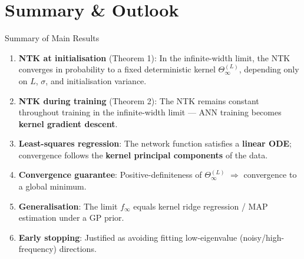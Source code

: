 \documentclass[aspectratio=169, 10pt]{beamer}
\newcommand{\NTK}{\Theta^{(L)}_\infty}
\newcommand{\highlight}[1]{\textcolor{blue!70!black}{\textbf{#1}}}
\begin{document}
\section{Summary \& Outlook}

\begin{frame}{Summary of Main Results}
  \begin{enumerate}
    \setlength\itemsep{0.5em}
    \item \textbf{NTK at initialisation} (Theorem 1): In the infinite-width limit, the NTK converges in probability to a fixed deterministic kernel $\NTK$, depending only on $L$, $\sigma$, and initialisation variance.
    \item \textbf{NTK during training} (Theorem 2): The NTK remains constant throughout training in the infinite-width limit — ANN training becomes \highlight{kernel gradient descent}.
    \item \textbf{Least-squares regression}: The network function satisfies a \textbf{linear ODE}; convergence follows the \highlight{kernel principal components} of the data.
    \item \textbf{Convergence guarantee}: Positive-definiteness of $\NTK$ $\Rightarrow$ convergence to a global minimum.
    \item \textbf{Generalisation}: The limit $f_\infty$ equals kernel ridge regression / MAP estimation under a GP prior.
    \item \textbf{Early stopping}: Justified as avoiding fitting low-eigenvalue (noisy/high-frequency) directions.
  \end{enumerate}
\end{frame}
\end{document}
